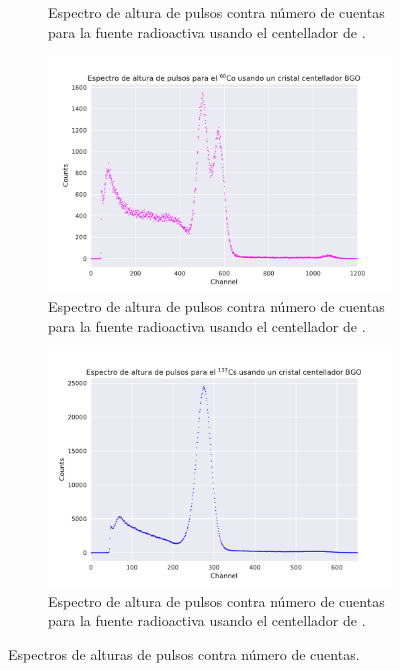 \documentclass[12pt]{article}
\begin{document}
\begin{figure}[!htb]
\begin{subfigure}{.5\textwidth}
                \caption{Espectro de altura de pulsos contra número de cuentas para la fuente radioactiva  usando el centellador de .}
                \label{fig:HeightPulseCsCsI}
            \end{subfigure}%
            \vspace{1cm}
            \begin{subfigure}{.5\textwidth}
                \centering
                \includegraphics[width=\textwidth, trim={1cm 0 1cm 0}, clip]{height_spectrum_BGO_60Co.pdf}
                \caption{Espectro de altura de pulsos contra número de cuentas para la fuente radioactiva  usando el centellador de .}
                \label{fig:HeightPulseCoBGO}
            \end{subfigure}%
            \begin{subfigure}{.5\textwidth}
                \centering
                \includegraphics[width=\textwidth, trim={1cm 0 1cm 0}, clip]{height_spectrum_BGO_137Cs.pdf}
                \caption{Espectro de altura de pulsos contra número de cuentas para la fuente radioactiva  usando el centellador de .}
                \label{fig:HeightPulseCsBGO}
            \end{subfigure}%
            \caption{Espectros de alturas de pulsos contra número de cuentas.}
            \label{fig:heightPulses}
        \end{figure}
\end{document}
